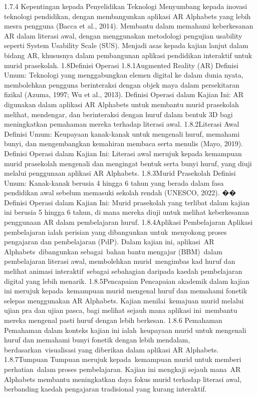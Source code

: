 1.7.4 Kepentingan kepada Penyelidikan Teknologi
Menyumbang kepada inovasi teknologi pendidikan, dengan membangunkan aplikasi AR Alphabets yang lebih mesra pengguna (Bacca et al., 2014). Membantu dalam memahami keberkesanan AR dalam literasi awal, dengan menggunakan metodologi pengujian usability seperti System Usability Scale (SUS). Menjadi asas kepada kajian lanjut dalam bidang AR, khususnya dalam pembangunan aplikasi pendidikan interaktif untuk murid prasekolah.
1.8Definisi Operasi
1.8.1Augmented Reality (AR)
Definisi Umum: Teknologi yang menggabungkan elemen digital ke dalam dunia nyata, membolehkan pengguna berinteraksi dengan objek maya dalam persekitaran fizikal  (Azuma, 1997; Wu et al., 2013). Definisi Operasi dalam Kajian Ini: AR digunakan dalam aplikasi AR Alphabets untuk membantu murid prasekolah melihat, mendengar, dan berinteraksi dengan huruf dalam bentuk 3D bagi meningkatkan pemahaman mereka terhadap literasi awal.
1.8.2Literasi Awal
Definisi Umum: Keupayaan kanak-kanak untuk mengenali huruf, memahami bunyi, dan mengembangkan kemahiran membaca serta menulis (Mayo, 2019). Definisi Operasi dalam Kajian Ini: Literasi awal merujuk kepada kemampuan murid prasekolah mengenali dan mengingat bentuk serta bunyi huruf, yang diuji melalui penggunaan aplikasi AR Alphabets.
1.8.3Murid Prasekolah
Definisi Umum: Kanak-kanak berusia 4 hingga 6 tahun yang berada dalam fasa pendidikan awal sebelum memasuki sekolah rendah (UNESCO, 2022). �� Definisi Operasi dalam Kajian Ini: Murid prasekolah yang terlibat dalam kajian ini berusia 5 hingga 6 tahun, di mana mereka diuji untuk melihat keberkesanan penggunaan AR dalam pembelajaran huruf.
1.8.4Aplikasi Pembelajaran
Aplikasi pembelajaran ialah perisian yang dibangunkan untuk menyokong proses pengajaran dan pembelajaran (PdP). Dalam kajian ini, aplikasi AR Alphabets dibangunkan sebagai bahan bantu mengajar (BBM) dalam pembelajaran literasi awal, membolehkan murid mengimbas kad huruf dan melihat animasi interaktif sebagai sebahagian daripada kaedah pembelajaran digital yang lebih menarik.
1.8.5Pencapaian
Pencapaian akademik dalam kajian ini merujuk kepada kemampuan murid mengenal huruf dan memahami fonetik selepas menggunakan AR Alphabets. Kajian menilai kemajuan murid melalui ujian pra dan ujian pasca, bagi melihat sejauh mana aplikasi ini membantu mereka mengenal pasti huruf dengan lebih berkesan.
1.8.6 Pemahaman
Pemahaman dalam konteks kajian ini ialah keupayaan murid untuk mengenali huruf dan memahami bunyi fonetik dengan lebih mendalam, berdasarkan visualisasi yang diberikan dalam aplikasi AR Alphabets.
1.8.7Tumpuan
Tumpuan merujuk kepada kemampuan murid untuk memberi perhatian dalam proses pembelajaran. Kajian ini mengkaji sejauh mana AR Alphabets membantu meningkatkan daya fokus murid terhadap literasi awal, berbanding kaedah pengajaran tradisional yang kurang interaktif.



